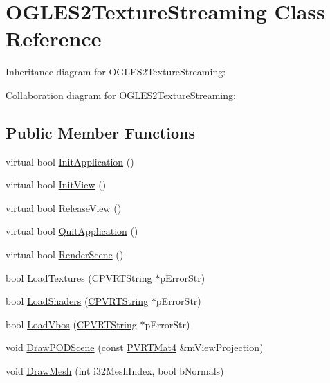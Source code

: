 \hypertarget{class_o_g_l_e_s2_texture_streaming}{\section{O\+G\+L\+E\+S2\+Texture\+Streaming Class Reference}
\label{class_o_g_l_e_s2_texture_streaming}
}


Inheritance diagram for O\+G\+L\+E\+S2\+Texture\+Streaming\+:


Collaboration diagram for O\+G\+L\+E\+S2\+Texture\+Streaming\+:
\subsection*{Public Member Functions}
\begin{DoxyCompactItemize}
\item 
virtual bool \hyperlink{class_o_g_l_e_s2_texture_streaming_a793b47b103e03b002c22c9a688a77ff1}{Init\+Application} ()
\item 
virtual bool \hyperlink{class_o_g_l_e_s2_texture_streaming_a4a2f414b0cdc515d045831a446466705}{Init\+View} ()
\item 
virtual bool \hyperlink{class_o_g_l_e_s2_texture_streaming_af9f82756a4b03395b0f6ac6ab9d9260f}{Release\+View} ()
\item 
virtual bool \hyperlink{class_o_g_l_e_s2_texture_streaming_ab6d4afbff0424de71791bd3e60c34581}{Quit\+Application} ()
\item 
virtual bool \hyperlink{class_o_g_l_e_s2_texture_streaming_a81a864d5dba20e3eb1093f596fcc2add}{Render\+Scene} ()
\item 
bool \hyperlink{class_o_g_l_e_s2_texture_streaming_a434d05e791209b1d8b4c2d1b86eb4b1b}{Load\+Textures} (\hyperlink{class_c_p_v_r_t_string}{C\+P\+V\+R\+T\+String} $\ast$p\+Error\+Str)
\item 
bool \hyperlink{class_o_g_l_e_s2_texture_streaming_aa6d1dc59d1cc58dfc13a3780a90d66e9}{Load\+Shaders} (\hyperlink{class_c_p_v_r_t_string}{C\+P\+V\+R\+T\+String} $\ast$p\+Error\+Str)
\item 
bool \hyperlink{class_o_g_l_e_s2_texture_streaming_a77a0143087ac56dbaa80aa9ca693cdf2}{Load\+Vbos} (\hyperlink{class_c_p_v_r_t_string}{C\+P\+V\+R\+T\+String} $\ast$p\+Error\+Str)
\item 
void \hyperlink{class_o_g_l_e_s2_texture_streaming_aafc982e6e01c3d4b0eede92c02f19919}{Draw\+P\+O\+D\+Scene} (const \hyperlink{struct_p_v_r_t_mat4}{P\+V\+R\+T\+Mat4} \&m\+View\+Projection)
\item 
void \hyperlink{class_o_g_l_e_s2_texture_streaming_a738013c68e5f4e418be0317f1812cd31}{Draw\+Mesh} (int i32\+Mesh\+Index, bool b\+Normals)
\end{DoxyCompactItemize}


